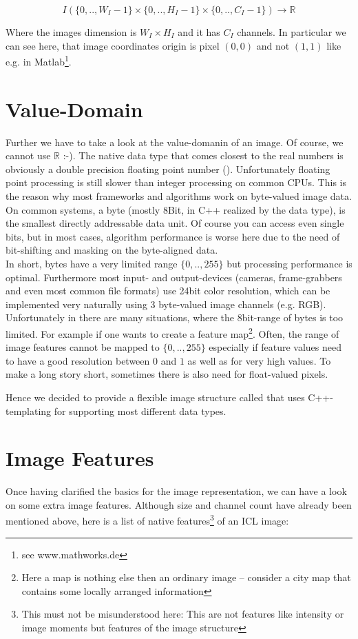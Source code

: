 \begin{equation}
  I(\{0,..,W_I-1\} \times{} \{0,..,H_I-1\} \times{} \{0,..,C_I-1\} ) \rightarrow \mathbb{R} 
\end{equation}


Where the images dimension is $W_I \times{}H_I$ and it has $C_I$ channels. In particular we can see here, that image coordinates origin is pixel $(0,0)$ and not $(1,1)$ like e.g. in Matlab\footnote{see www.mathworks.de}. 


\section{Value-Domain}
Further we have to take a look at the value-domanin of an image. 
Of course, we cannot use $\mathbb{R}$ :-). The native data type that comes closest to the real numbers is obviously a double precision floating point number (). Unfortunately floating point processing is still slower than integer processing on common CPUs. This is the reason why most frameworks and algorithms work on byte-valued image data. On common systems, a byte (mostly 8Bit, in C++ realized by the  data type), is the smallest directly addressable data unit. Of course you can access even single bits, but in most cases, algorithm performance is worse here due to the need of bit-shifting and masking on the byte-aligned data.\\
In short, bytes have a very limited range $\{0,..,255\}$ but processing performance is optimal. Furthermore most input- and output-devices (cameras, frame-grabbers and even most common file formats) use 24bit color resolution, which can be implemented very naturally using 3 byte-valued image channels (e.g. RGB).
Unfortunately in there are many situations, where the 8bit-range of bytes is too limited. For example if one wants to create a feature map\footnote{Here a map is nothing else then an ordinary image -- consider a city map that contains some locally arranged information}. Often, the range of image features cannot be mapped to $\{0,..,255\}$ especially if feature values need to have a good resolution between $0$ and $1$ as well as for very high values. To make a long story short, sometimes there is also need for float-valued pixels.

Hence we decided to provide a flexible image structure called  that uses C++-templating for supporting most different data types.

\section{Image Features}
Once having clarified the basics for the image representation, we can have a look on some extra image features. Although size and channel count have already been mentioned above, here is a list of native features\footnote{This must not be misunderstood here: This are not features like intensity or image moments but features of the image structure} of an ICL image:

